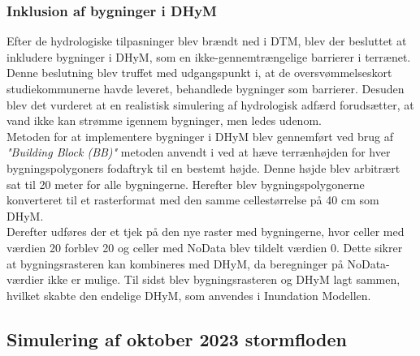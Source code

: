 \subsubsection{Inklusion af bygninger i DHyM} \label{Afsnit: Inklusion af bygninger i DHyM}

Efter de hydrologiske tilpasninger blev brændt ned i DTM, blev der besluttet at inkludere bygninger i DHyM, som en ikke-gennemtrængelige barrierer i terrænet. Denne beslutning blev truffet med udgangspunkt i, at de oversvømmelseskort studiekommunerne havde leveret, behandlede bygninger som barrierer. Desuden blev det vurderet at en realistisk simulering af hydrologisk adfærd forudsætter, at vand ikke kan strømme igennem bygninger, men ledes udenom. \\

Metoden for at implementere bygninger i DHyM blev gennemført ved brug af \textit{"Building Block (BB)"} metoden anvendt i \cite{khosh_bin_ghomash_technical_2024} ved at hæve terrænhøjden for hver bygningspolygoners fodaftryk til en bestemt højde. Denne højde blev arbitrært sat til 20 meter for alle bygningerne. Herefter blev bygningspolygonerne konverteret til et rasterformat med den samme cellestørrelse på 40 cm som DHyM. \\
Derefter udføres der et tjek på den nye raster med bygningerne, hvor celler med værdien 20 forblev 20 og celler med NoData blev tildelt værdien 0. Dette sikrer at bygningsrasteren kan kombineres med DHyM, da beregninger på NoData-værdier ikke er mulige. Til sidst blev bygningsrasteren og DHyM lagt sammen, hvilket skabte den endelige DHyM, som anvendes i Inundation Modellen.


\subsection{Simulering af oktober 2023 stormfloden}\label{Afsnit: Simulering af stormflod 2023}

